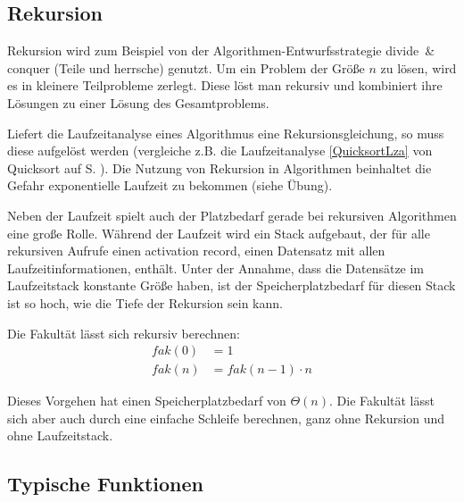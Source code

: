 \subsection{Rekursion}
Rekursion wird zum Beispiel von der Algorithmen-Entwurfsstrategie divide~\& conquer (Teile und herrsche) genutzt. Um ein Problem der Größe $n$ zu lösen, wird es in kleinere Teilprobleme zerlegt. Diese löst man rekursiv und kombiniert ihre Lösungen zu einer Lösung des Gesamtproblems.

Liefert die Laufzeitanalyse eines Algorithmus eine Rekursionsgleichung, so muss diese aufgelöst werden (vergleiche z.B. die Laufzeitanalyse \ref{QuicksortLza} von Quicksort auf S. \pageref{QuicksortLza}). Die Nutzung von Rekursion in Algorithmen beinhaltet die Gefahr exponentielle Laufzeit zu bekommen (siehe Übung).

Neben der Laufzeit spielt auch der Platzbedarf gerade bei rekursiven Algorithmen eine große Rolle. Während der Laufzeit wird ein Stack aufgebaut, der für alle rekursiven Aufrufe einen activation record, einen Datensatz mit allen Laufzeitinformationen, enthält. Unter der Annahme, dass die Datensätze im Laufzeitstack konstante Größe haben, ist der Speicherplatzbedarf für diesen Stack ist so hoch, wie die Tiefe der Rekursion sein kann.

\begin{Bsp}[Fakultät]
\hspace{\parindent}
Die Fakultät lässt sich rekursiv berechnen:
\begin{align*}
fak(0) &= 1 \\
fak(n) &= fak(n-1) \cdot n
\end{align*}

Dieses Vorgehen hat einen Speicherplatzbedarf von $\Theta (n)$. Die Fakultät lässt sich aber auch durch eine einfache Schleife berechnen, ganz ohne Rekursion und ohne Laufzeitstack.
\end{Bsp}

\subsection{Typische Funktionen}


